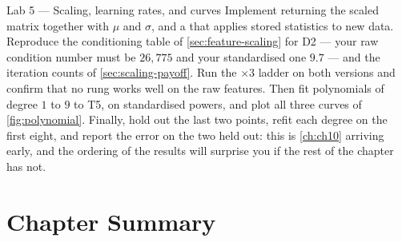 \begin{labbox}{Lab 5 --- Scaling, learning rates, and curves}
Implement  returning the scaled matrix together with $\mu$ and
$\sigma$, and a  that applies stored statistics to new data.
Reproduce the conditioning table of \cref{sec:feature-scaling} for D2 --- your
raw condition number must be $26{,}775$ and your standardised one $9.7$ --- and
the iteration counts of \cref{sec:scaling-payoff}. Run the $\times 3$ ladder on
both versions and confirm that no rung works well on the raw features. Then fit
polynomials of degree $1$ to $9$ to T5, on standardised powers, and plot all
three curves of \cref{fig:polynomial}. Finally, hold out the last two points,
refit each degree on the first eight, and report the error on the two held out:
this is \cref{ch:ch10} arriving early, and the ordering of the results will
surprise you if the rest of the chapter has not.
\end{labbox}

\section*{Chapter Summary}

